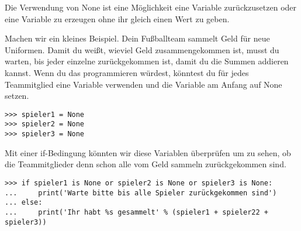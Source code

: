 Die Verwendung von None ist eine Möglichkeit eine Variable zurückzusetzen oder eine Variable zu erzeugen ohne ihr gleich einen Wert zu geben.
\par
Machen wir ein kleines Beispiel. Dein Fußballteam sammelt Geld für neue Uniformen. Damit du weißt, wieviel Geld zusammengekommen ist, musst du warten, bis jeder einzelne zurückgekommen ist, damit du die Summen addieren kannst. Wenn du das programmieren würdest, könntest du für jedes Teammitglied eine Variable verwenden und die Variable am Anfang auf None setzen.

\begin{listing}
\begin{verbatim}
>>> spieler1 = None
>>> spieler2 = None
>>> spieler3 = None
\end{verbatim}
\end{listing}

Mit einer if-Bedingung könnten wir diese Variablen überprüfen um zu sehen, ob die Teammitglieder denn schon alle vom Geld sammeln zurückgekommen sind.

\begin{listing}
\begin{verbatim}
>>> if spieler1 is None or spieler2 is None or spieler3 is None:
...     print('Warte bitte bis alle Spieler zurückgekommen sind')
... else:
...     print('Ihr habt %s gesammelt' % (spieler1 + spieler22 + spieler3))
\end{verbatim}
\end{listing}

